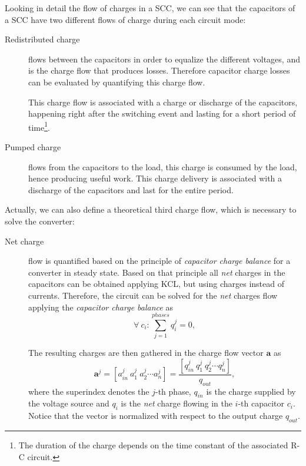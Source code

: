 Looking in detail the flow of charges in a SCC, we can see that the capacitors of a SCC have two different flows of charge during each circuit mode:
\begin{description}

  \item[Redistributed charge] flows between the capacitors in order to equalize the different voltages, and is the charge flow that produces losses. Therefore capacitor charge losses can be evaluated by quantifying this charge flow.

      This charge flow is associated with a charge or discharge of the capacitors, happening right after the switching event and lasting for a short period of time\footnote{The duration of the charge depends on the time constant of the associated R-C circuit.}.

  \item[Pumped charge] flows from the capacitors to the load, this charge is consumed by the load, hence producing useful work.  This charge delivery is associated with a discharge of the capacitors and last for the entire period.

\end{description}
Actually, we can also define a theoretical third charge flow, which is necessary to solve the converter:
\begin{description}

  \item[Net charge] flow is quantified based on the principle of \emph{capacitor charge balance} for a converter in steady state. Based on that principle all \emph{net} charges in the capacitors can be obtained applying KCL, but using charges instead of currents. Therefore, the circuit can be solved for the \emph{net} charges flow applying
      the \emph{capacitor charge balance} as 
      \begin{equation}
       \forall~c_{i} : \sum_{j=1}^{phases}q_{i}^j = 0,
      \label{eq:charge_balance}
      \end{equation}

     The resulting charges are then gathered in the charge flow vector $\mathbf{a}$ as
       \begin{equation}
        \mathbf{a}^j =  \left[ a_{in}^j~a_1^j~a_2^j \cdots a_n^j \right] = \frac{\left[ q_{in}^j~q_1^j~q_2^j \cdots q_n^j \right]}{q_{out}},
      \label{eq:a_vector}
      \end{equation}
    where the superindex denotes the $j$-th phase, $q_{in}$ is the charge supplied by the voltage source and $q_i$ is the \emph{net} charge flowing in the $i$-th capacitor $c_i$. Notice that the vector is normalized with respect to the output charge $q_{out}$.

\end{description}


